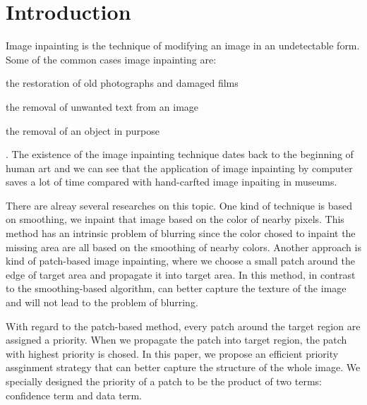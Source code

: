 \section{Introduction}
Image inpainting is the technique of modifying an image in an undetectable
form. Some of the common cases image inpainting are:
\begin{enumerate*}[label=(\roman*)]
    \item the restoration of old photographs and damaged films
    \item the removal of unwanted text from an image
    \item the removal of an object in purpose
\end{enumerate*}. The existence of the image inpainting technique dates
back to the beginning of human art and we can see that the application of
image inpainting by computer saves a lot of time compared with hand-carfted
image inpaiting in museums.

There are alreay several researches on this topic. One kind of technique is
based on smoothing, \ie we inpaint that image based on the color of nearby
pixels. This method has an intrinsic problem of blurring since the color
chosed to inpaint the missing area are all based on the smoothing of nearby
colors. Another approach is kind of patch-based image inpainting, where
we choose a small patch around the edge of target area and propagate it into
target area. In this method, in contrast to the smoothing-based algorithm,
can better capture the texture of the image and will not lead to the problem
of blurring.

With regard to the patch-based method, every patch around the target region
are assigned a priority. When we propagate the patch into target region,
the patch with highest priority is chosed. In this paper, we propose an
efficient priority assginment strategy that can better capture the structure
of the whole image. We specially designed the priority of a patch to be 
the product of two terms: confidence term and data term.
